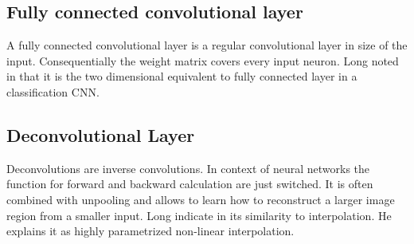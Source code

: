 \subsection{Fully connected convolutional layer}
A fully connected convolutional layer is a regular convolutional layer in size
of the input. Consequentially the weight matrix covers every input neuron. Long
noted in \cite{long2014fully} that it is the two dimensional equivalent to
fully connected layer in a classification \gls{CNN}.

\subsection{Deconvolutional Layer}
Deconvolutions are inverse convolutions. In context of neural networks the
function for forward and backward calculation are just switched. It is often combined with unpooling and allows to learn how to reconstruct a larger image region from a smaller input. Long indicate in \cite{long2014fully} its similarity to interpolation. He explains it as highly parametrized non-linear interpolation.
